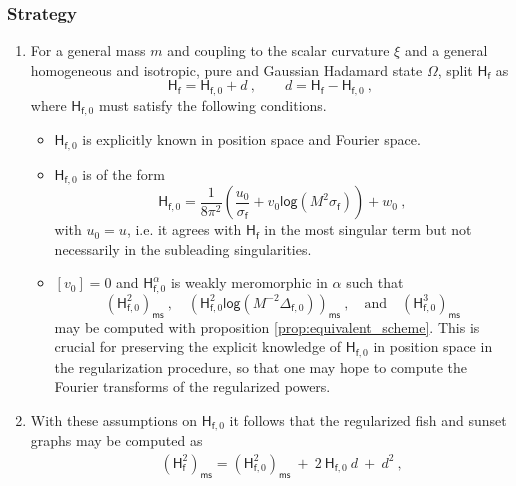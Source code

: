 \documentclass[11pt]{book}
\newcommand{\ms}{\mathsf{ms}}
\renewcommand{\log}{\mathsf{log}}
\newcommand{\Hsf}{\mathsf{H}}
\newcommand{\fsf}{\mathsf{f}}
\theoremstyle{break}
\begin{document}
\subsubsection{Strategy}


\begin{enumerate}
%
%
\item For a general mass $m$ and coupling to the scalar curvature $\xi$ and a general homogeneous and isotropic, pure and Gaussian Hadamard state $\Omega$, split $\Hsf_\fsf$ as
%
\begin{equation}
\Hsf_\fsf = \Hsf_{\fsf,0} + d \ , \qquad d = \Hsf_\fsf - \Hsf_{\fsf,0} \ ,
\label{eq:propagator_split}
\end{equation}
%
where $\Hsf_{\fsf,0}$ must satisfy the following conditions.
%
\begin{itemize}
%
\item $\Hsf_{\fsf,0}$ is explicitly known in position space and Fourier space.
%
\item $\Hsf_{\fsf,0}$ is of the form
%
\begin{equation*}
\Hsf_{\fsf,0} = \frac{1}{8\pi^2} \left( \frac{u_0}{\sigma_\fsf} + v_0 \log\left(M^2\sigma_\fsf\right) \right) + w_0 \ , 
\end{equation*}
%
with $u_0=u$, i.e. it agrees with $\Hsf_\fsf$ in the most singular term but not necessarily in the subleading singularities.
%
\item $[v_0]=0$ and $\Hsf^{\alpha}_{\fsf,0}$ is weakly meromorphic in $\alpha$ such that
%
\begin{equation*}
\left(\Hsf^2_{\fsf,0}\right)_\ms \ , \quad 
\left(\Hsf^2_{\fsf,0} \log\left(M^{-2} \Delta_{\fsf,0}\right) \right)_\ms \ , \quad
\mbox{and} \quad \left(\Hsf^3_{\fsf,0}\right)_\ms 
\end{equation*}
%
may be computed with proposition \ref{prop:equivalent_scheme}. This is crucial for preserving the explicit knowledge of $\Hsf_{\fsf,0}$ in position space in the regularization procedure, so that one may hope to compute the Fourier transforms of the regularized powers.
%
\end{itemize}
%
%
\item With these assumptions on $\Hsf_{\fsf,0}$ it follows that the regularized fish and sunset graphs may be computed as
%
\begin{eqnarray}
&& (\Hsf_\fsf^2)_\ms = (\Hsf_{\fsf,0}^2)_\ms \ + \ 2 \ \Hsf_{\fsf,0} \ d \ + \ d^2 \ , \nonumber \\

\end{eqnarray}
\end{enumerate}
\end{document}

